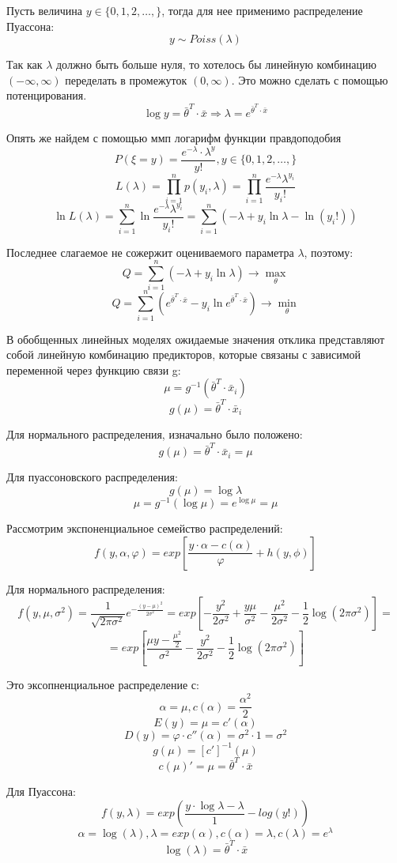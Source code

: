 \documentclass[aps,%
12pt,%
final,%
oneside,
onecolumn,%
musixtex, %
superscriptaddress,%
centertags]{article} %
\begin{document}
Пусть величина $y \in \{0,1,2,\ldots, \}$, тогда для нее применимо распределение Пуассона:
$$y \sim Poiss(\lambda)$$

Так как $\lambda $ должно быть больше нуля, то хотелось бы линейную комбинацию $(-\infty, \infty)$ переделать в промежуток $(0,\infty)$. Это можно сделать с помощью потенцирования.
$$\log y =  \left .\bar{\theta}\right .^T \cdot \bar{x} \Rightarrow \lambda = e^{\left .\bar{\theta}\right .^T \cdot \bar{x}}$$

Опять же найдем с помощью ммп логарифм функции правдоподобия
$$P(\xi = y)  = \frac{e^{-\lambda}\cdot \lambda^y}{y!}, y \in \{0,1,2,\ldots, \} $$
$$L(\lambda) = \prod\limits_{i=1}^n p(y_i,\lambda) = \prod\limits_{i=1}^n \frac{e^{-\lambda} \lambda^{y_i}}{y_i !}$$
$$\ln L(\lambda) = \sum\limits_{i=1}^n \ln \frac{e^{-\lambda} \lambda^{y_i}}{y_i !} =\sum\limits_{i=1}^n (-\lambda + y_i \ln \lambda - \ln(y_i !))$$

Последнее слагаемое не сожержит оцениваемого параметра $\lambda$, поэтому:
$$Q =\sum\limits_{i=1}^n (-\lambda + y_i \ln \lambda ) \to \underset{\theta}{\max}$$
$$Q = \sum\limits_{i=1}^n ( e^{\left .\bar{\theta}\right .^T \cdot \bar{x}}  - y_i \ln  e^{\left .\bar{\theta}\right .^T \cdot \bar{x}} ) \to \underset{\theta}{\min}$$

В обобщенных линейных моделях ожидаемые значения отклика представляют
собой линейную комбинацию предикторов, которые связаны с зависимой переменной
через функцию связи g:
$$\mu = g^{-1}(\left .\bar{\theta}\right .^T \cdot \bar{x}_i)$$
$$g(\mu) = \left .\bar{\theta}\right .^T \cdot \bar{x}_i$$

Для нормального распределения, изначально было положено:
$$g(\mu) = \left .\bar{\theta}\right .^T \cdot \bar{x}_i = \mu$$

Для пуассоновского распределения:
$$g(\mu) = \log \lambda$$
$$\mu = g^{-1}(\log \mu) = e^{\log \mu} = \mu$$

Рассмотрим экспоненциальное семейство распределений:
$$f(y,\alpha,\varphi) = exp \left[\frac{y\cdot \alpha - c(\alpha)}{\varphi} + h(y,\phi) \right]$$

Для нормального распределения:
$$f(y,\mu,\sigma^2) = \frac{1}{\sqrt{2\pi\sigma^2}} e^{-\frac{(y-\mu)^2}{2\sigma^2}} = exp \left[-\frac{y^2}{2\sigma^2}+\frac{y \mu}{\sigma^2} -\frac{\mu^2}{2\sigma^2} - \frac{1}{2} \log (2\pi \sigma^2)\right] = $$
$$ = exp \left[ \frac{\mu y - \frac{\mu^2}{2}}{\sigma^2} - \frac{y^2}{2\sigma^2} - \frac{1}{2} \log (2\pi \sigma^2)\right]$$

Это эксопненциальное распределение с:
$$\alpha = \mu,  c(\alpha) = \frac{\alpha^2}{2}$$
$$E(y) = \mu  = c' (\alpha)$$
$$D(y) = \varphi \cdot c''(\alpha) = \sigma^2 \cdot 1 = \sigma^2 $$
$$g(\mu)  =[c']^{-1}(\mu)$$
$$c(\mu)' = \mu =\left .\bar{\theta}\right .^T \cdot \bar{x} $$

Для Пуассона:
$$f(y,\lambda) = exp\left(\frac{y\cdot\log\lambda - \lambda}{1} - log(y!)\right)$$
$$\alpha = \log(\lambda), \lambda = exp(\alpha), c(\alpha) = \lambda, c(\lambda) = e^{\lambda}$$
$$\log(\lambda) = \left .\bar{\theta}\right .^T \cdot \bar{x}$$
\end{document}
